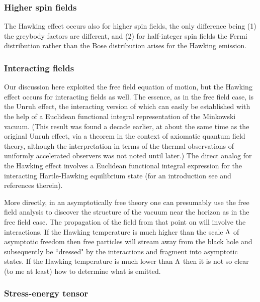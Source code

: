 \documentclass[12pt]{article}
\begin{document}
\subsubsection{Higher spin fields}

The Hawking effect occurs also for
higher spin fields, the only difference being
(1) the greybody factors are different, and (2)
for half-integer spin fields the Fermi distribution rather than
the Bose distribution arises for the Hawking emission.

\subsubsection{Interacting fields}

Our discussion here exploited the free field equation of motion,
but the Hawking effect occurs for interacting fields as well.
The essence, as in the free field case, is
the Unruh effect, the interacting version of which can easily
be established with the help of a Euclidean functional integral
representation of the Minkowski vacuum\cite{Unruh:1983ac}.
(This result was found a decade earlier, 
at about the same time as the original Unruh effect,
via a theorem\cite{BisoWich} in the context of axiomatic quantum field theory, although the interpretation in terms of the thermal observations of uniformly accelerated observers was not noted 
until later\cite{Sewell}.) The direct analog for the Hawking effect 
involves a Euclidean functional integral expression for the
interacting  Hartle-Hawking equilibrium state 
(for an introduction see \cite{TJnote,TJmicro} and references therein). 

More directly, in an asymptotically free theory one can 
presumably use the free field analysis to discover the
structure of the vacuum near the horizon as in the
free field case. The propagation of the field from that
point on will involve the interactions. If the Hawking temperature
is much higher than the scale $\Lambda$ of asymptotic freedom then
free particles will stream away from the black hole and subsequently 
be ``dressed" by the interactions and fragment
into asymptotic states\cite{MacGibbon:zk, MacGibbon:tj}. 
If the Hawking temperature is much
lower than $\Lambda$ then it is not so clear (to me at least) how
to determine what is emitted.

\subsubsection{Stress-energy tensor}
\end{document}
